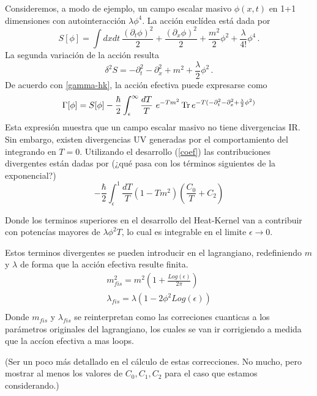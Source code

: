 Consideremos, a modo de ejemplo, un campo escalar masivo $\phi(x,t)$ en 1+1 dimensiones con autointeracción $\lambda \phi ^4 $. La acción euclídea está dada por
\begin{equation}
S[ \phi ] = \int dx dt \ 
\frac{( \partial _t \phi ) ^2}{2} +  
\frac{( \partial _x \phi ) ^2}{2} +
\frac{m ^2 }{2} \phi ^2 +
\frac{\lambda}{4!} \phi ^4 \,.
\end{equation}
La segunda variación de la acción resulta
\begin{equation}
\delta ^2 S = 
- \partial _t ^2 
- \partial _x ^2 
+ m ^2 
+ \frac{\lambda}{2}\phi ^2 \,.
\end{equation}
De acuerdo con \eqref{gamma-hk}, la acción efectiva puede expresarse como
\begin{equation}
\Gamma [ \phi ] = 
S[ \phi ] - 
\frac{\hbar }{2}
\int _ { \epsilon } ^{\infty} \frac{ dT}{T} 
\ e ^{- T m ^2 }
\,{\rm Tr} \,  e ^{- T ( - \partial _t ^2 - \partial _x ^2 + \frac{\lambda}{2} \phi ^2 ) }
\end{equation}
Esta expresión muestra que un campo escalar masivo no tiene divergencias IR. Sin embargo, existen divergencias UV generadas por el comportamiento del integrando en $T=0$. Utilizando el desarrollo (\ref{coef}) las contribuciones divergentes están dadas por {(\red ¿qué pasa con los términos siguientes de la exponencial?)}
\begin{equation}
- \frac{\hbar }{2}\int _ { \epsilon } ^{1}  
\frac{ dT}{T} 
\left(
		1 - T m^2
		\right)
\left(
		\frac{C _0}{T} + C _2 
		\right)
\end{equation}
{\magenta Donde los terminos superiores en el  desarrollo del Heat-Kernel van a contribuir con potencías mayores de $ \lambda \phi ^2 T $, lo cual es integrable en el limite $\epsilon \rightarrow 0 $.

Estos terminos divergentes se pueden introducir en el lagrangiano, redefiniendo $m$ y $\lambda$ de forma que la acción efectiva resulte finita.
\begin{equation}
\begin{array}{c}
m ^2 _{fis} = m ^2 \left(
							1 + \frac{Log (\epsilon)}{2 \pi} 
							\right) \\[10pt]
							
\lambda _{fis} = \lambda \left(
								 1 - 2 \phi ^2 Log( \epsilon )
								 \right) \\[10pt]


\end{array}
\end{equation}
Donde $m _{fis}$ y $ \lambda _{fis} $ se reinterpretan como las correciones cuanticas a los parámetros originales del lagrangiano, los cuales se van ir corrigiendo a medida que la accíon efectiva a mas loops.} {\red (Ser un poco más detallado en el cálculo de estas correcciones. No mucho, pero mostrar al menos los valores de $C_0,C_1,C_2$ para el caso que estamos considerando.)}

